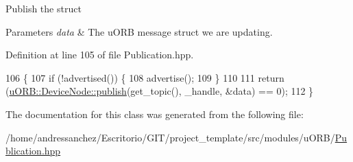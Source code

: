 Publish the struct 
\begin{DoxyParams}{Parameters}
{\em data} & The u\+O\+RB message struct we are updating. \\
\hline
\end{DoxyParams}


Definition at line 105 of file Publication.\+hpp.


\begin{DoxyCode}
106     \{
107         \textcolor{keywordflow}{if} (!advertised()) \{
108             advertise();
109         \}
110 
111         \textcolor{keywordflow}{return} (\hyperlink{classuORB_1_1DeviceNode_ae715517a1f3a2f361e37d061b59a4560}{uORB::DeviceNode::publish}(get\_topic(), \_handle, &data) == 0);
112     \}
\end{DoxyCode}


The documentation for this class was generated from the following file\+:\begin{DoxyCompactItemize}
\item 
/home/andressanchez/\+Escritorio/\+G\+I\+T/project\+\_\+template/src/modules/u\+O\+R\+B/\hyperlink{Publication_8hpp}{Publication.\+hpp}\end{DoxyCompactItemize}

